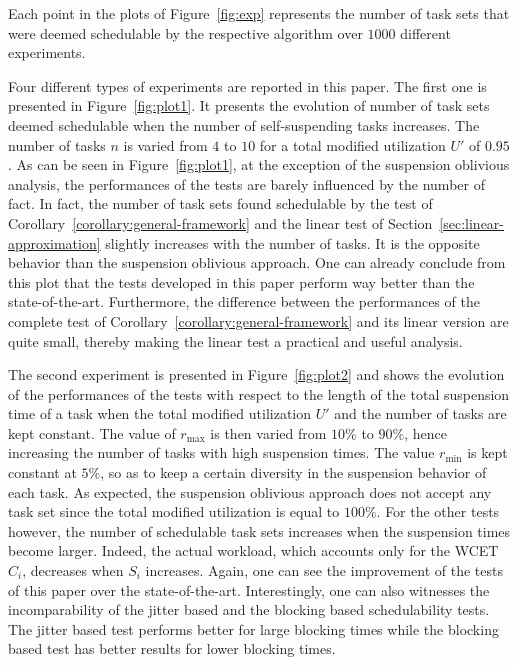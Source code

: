 Each point in the plots of Figure~\ref{fig:exp} represents the number of task sets that were deemed schedulable by the respective algorithm over $1000$ different experiments.

Four different types of experiments are reported in this paper. The first one is presented in Figure~\ref{fig:plot1}. It presents the evolution of number of task sets deemed schedulable when the number of self-suspending tasks increases. The number of tasks $n$ is varied from $4$ to $10$ for a total modified utilization $U'$ of $0.95$. As can be seen in Figure~\ref{fig:plot1}, at the exception of the suspension oblivious analysis, the performances of the tests are barely influenced by the number of fact. In fact, the number of task sets found schedulable by the test of Corollary~\ref{corollary:general-framework} and the linear test of Section~\ref{sec:linear-approximation} slightly increases with the number of tasks. It is the opposite behavior than the suspension oblivious approach. One can already conclude from this plot that the tests developed in this paper perform way better than the state-of-the-art. Furthermore, the difference between the performances of the complete test of Corollary~\ref{corollary:general-framework} and its linear version are quite small, thereby making the linear test a practical and useful analysis.

The second experiment is presented in Figure~\ref{fig:plot2} and shows the evolution of the performances of the tests with respect to the length of the total suspension time of a task when the total modified utilization $U'$ and the number of tasks are kept constant. The value of $r_{\max}$ is then varied from $10\%$ to $90\%$, hence increasing the number of tasks with high suspension times. The value $r_{\min}$ is kept constant at $5\%$, so as to keep a certain diversity in the suspension behavior of each task. As expected, the suspension oblivious approach does not accept any task set since the total modified utilization is equal to $100\%$. For the other tests however, the number of schedulable task sets increases when the suspension times become larger. Indeed, the actual workload, which accounts only for the WCET $C_i$, decreases when $S_i$ increases. Again, one can see the improvement of the tests of this paper over the state-of-the-art. Interestingly, one can also witnesses the incomparability of the jitter based and the blocking based schedulability tests. The jitter based test performs better for large blocking times while the blocking based test has better results for lower blocking times.

